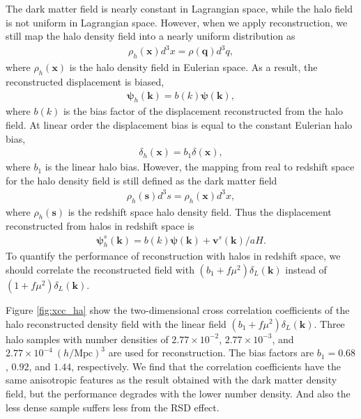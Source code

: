 \documentclass[aps,prx,twocolumn,superscriptaddress,groupedaddress,nofootinbib,amsfont]{revtex4}  %
\newcommand{\mr}{\mathrm}
\newcommand{\bea}{\begin{eqnarray}}
\newcommand{\eea}{\end{eqnarray}}
\newcommand{\bmp}{\bm{\psi}}
\newcommand{\bmv}{\bm{v}}
\newcommand{\bmk}{\bm{k}}
\newcommand{\bmx}{\bm{x}}
\newcommand{\bms}{\bm{s}}
\newcommand{\bmq}{\bm{q}}
\begin{document}
The dark matter field is nearly constant in Lagrangian space, while the halo 
field is not uniform in Lagrangian space. 
However, when we apply reconstruction,
we still map the halo density field into a nearly uniform distribution as
\bea
\rho_h(\bmx)d^3x=\rho(\bmq)d^3q,
\eea
where $\rho_h(\bmx)$ is the halo density field in Eulerian space. As a result,
the reconstructed displacement is biased,
\bea
\bmp_h(\bmk)=b(k)\bmp(\bmk),
\eea
where $b(k)$ is the bias factor of the displacement reconstructed from the 
halo field. At linear order the displacement bias is equal to the constant 
Eulerian halo bias,
\bea
\delta_h(\bmx)=b_1\delta(\bmx),
\eea
where $b_1$ is the linear halo bias. However, the mapping from real to redshift
space for the halo density field is still defined as the dark matter field
\bea
\rho_h(\bms)d^3s=\rho_h(\bmx)d^3x,
\eea
where $\rho_h(\bms)$ is the redshift space halo density field. 
Thus the displacement reconstructed from halos in redshift space is 
\bea
\bmp^s_h(\bmk)=b(k)\bmp(\bmk)+{\bmv^s(\bmk)}/{aH}.
\eea
To quantify the performance of reconstruction with halos in redshift space,
we should correlate the reconstructed field with $(b_1+f\mu^2)\delta_L(\bmk)$
instead of $(1+f\mu^2)\delta_L(\bmk)$.

Figure \ref{fig:xcc_ha} show the two-dimensional cross correlation coefficients 
of the halo reconstructed density field with the linear field $(b_1+f\mu^2)\delta_L(\bmk)$.
Three halo samples with number densities of $2.77\times10^{-2}$, $2.77\times10^{-3}$, and $2.77\times10^{-4}\ (h/\mr{Mpc})^3$ are used for reconstruction.
The bias factors are $b_1=0.68$, $0.92$, and $1.44$, respectively.
We find that the correlation coefficients have the same anisotropic features 
as the result obtained with the dark matter density field, but the performance 
degrades with the lower number density. And also the less dense sample suffers
less from the RSD effect.
\end{document}
